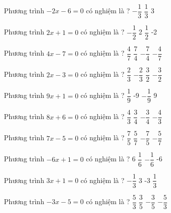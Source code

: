 \begin{ex} 
	Phương trình $-2x-6=0$ có nghiệm là ? 
	\choice
	{$- \dfrac{ 1 }{ 3 } $}
	{$ \dfrac{ 1 }{ 3 } $}
	{}
	{3}
	\loigiai{} 
\end{ex}

\begin{ex} 
	Phương trình $2x+1=0$ có nghiệm là ? 
	\choice
	{\True $- \dfrac{ 1 }{ 2 } $}
	{2}
	{$ \dfrac{ 1 }{ 2 } $}
	{-2}
	\loigiai{} 
\end{ex}

\begin{ex} 
	Phương trình $4x-7=0$ có nghiệm là ? 
	\choice
	{$ \dfrac{ 4 }{ 7 } $}
	{\True $ \dfrac{ 7 }{ 4 } $}
	{$- \dfrac{ 7 }{ 4 } $}
	{$- \dfrac{ 4 }{ 7 } $}
	\loigiai{} 
\end{ex}

\begin{ex} 
	Phương trình $2x-3=0$ có nghiệm là ? 
	\choice
	{$ \dfrac{ 2 }{ 3 } $}
	{$- \dfrac{ 2 }{ 3 } $}
	{\True $ \dfrac{ 3 }{ 2 } $}
	{$- \dfrac{ 3 }{ 2 } $}
	\loigiai{} 
\end{ex}

\begin{ex} 
	Phương trình $9x+1=0$ có nghiệm là ? 
	\choice
	{$ \dfrac{ 1 }{ 9 } $}
	{-9}
	{\True $- \dfrac{ 1 }{ 9 } $}
	{9}
	\loigiai{} 
\end{ex}

\begin{ex} 
	Phương trình $8x+6=0$ có nghiệm là ? 
	\choice
	{$ \dfrac{ 4 }{ 3 } $}
	{$ \dfrac{ 3 }{ 4 } $}
	{\True $- \dfrac{ 3 }{ 4 } $}
	{$- \dfrac{ 4 }{ 3 } $}
	\loigiai{} 
\end{ex}

\begin{ex} 
	Phương trình $7x-5=0$ có nghiệm là ? 
	\choice
	{$ \dfrac{ 7 }{ 5 } $}
	{\True $ \dfrac{ 5 }{ 7 } $}
	{$- \dfrac{ 7 }{ 5 } $}
	{$- \dfrac{ 5 }{ 7 } $}
	\loigiai{} 
\end{ex}

\begin{ex} 
	Phương trình $-6x+1=0$ có nghiệm là ? 
	\choice
	{6}
	{\True $ \dfrac{ 1 }{ 6 } $}
	{$- \dfrac{ 1 }{ 6 } $}
	{-6}
	\loigiai{} 
\end{ex}

\begin{ex} 
	Phương trình $3x+1=0$ có nghiệm là ? 
	\choice
	{\True $- \dfrac{ 1 }{ 3 } $}
	{3}
	{-3}
	{$ \dfrac{ 1 }{ 3 } $}
	\loigiai{} 
\end{ex}

\begin{ex} 
	Phương trình $-3x-5=0$ có nghiệm là ? 
	\choice
	{$ \dfrac{ 5 }{ 3 } $}
	{$ \dfrac{ 3 }{ 5 } $}
	{$- \dfrac{ 3 }{ 5 } $}
	{\True $- \dfrac{ 5 }{ 3 } $}
	\loigiai{} 
\end{ex}

